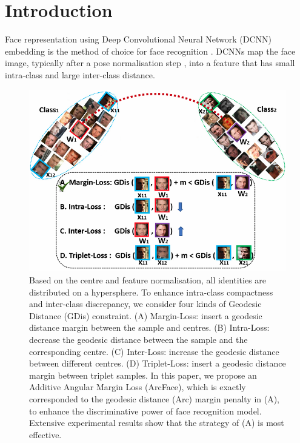 \documentclass[10pt,twocolumn,letterpaper]{article}
\begin{document}
\section{Introduction}

Face representation using Deep Convolutional Neural Network (DCNN) embedding is the method of choice for face recognition \cite{sun2014deep,taigman2014deepface,schroff2015facenet,parkhi2015deep}. DCNNs map the face image, typically after a pose normalisation step \cite{zhang2016joint}, into a feature that has small intra-class and large inter-class distance. 

\begin{figure}[t!]
\centering
\includegraphics[width=0.8\linewidth]{image/arcfaces.png}
\caption{Based on the centre \cite{liu2017sphereface} and feature \cite{tencent2017CosineFace} normalisation, all identities are distributed on a hypersphere. To enhance intra-class compactness and inter-class discrepancy, we consider four kinds of Geodesic Distance (GDis) constraint. (A) Margin-Loss: insert a geodesic distance margin between the sample and centres. (B) Intra-Loss: decrease the geodesic distance between the sample and the corresponding centre. (C) Inter-Loss: increase the geodesic distance between different centres. (D) Triplet-Loss: insert a geodesic distance margin between triplet samples. In this paper,  we propose an Additive Angular Margin Loss (ArcFace), which is exactly corresponded to the geodesic distance (Arc) margin penalty in (A), to enhance the discriminative power of face recognition model. Extensive experimental results show that the strategy of (A) is most effective. }
\vspace{-6mm}
\label{fig:arcfaceexplaination}
\end{figure}
\end{document}

